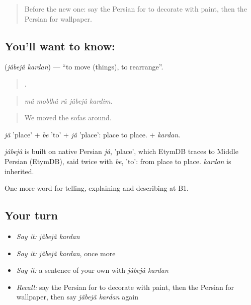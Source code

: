\label{lesson:FA-C537-jabeja-kardan}



\begin{quote}
Before the new one: say the Persian for to decorate with paint, then the Persian for wallpaper.
\end{quote}

\subsection*{You'll want to know:  }
\textbf{ } (\emph{jâbejâ kardan}) — \textquotedblleft{}to move (things), to rearrange\textquotedblright{}.

\begin{quote}
    .
\end{quote}

\begin{quote}
\emph{mâ moblhâ râ jâbejâ kardim.}
\end{quote}

\begin{quote}
We moved the sofas around.
\end{quote}

\emph{jâ} 'place' + \emph{be} 'to' + \emph{jâ} 'place': place to place. + \emph{kardan}.

\begin{cousinweb}
\emph{jâbejâ} is built on native Persian \emph{jâ}, 'place', which EtymDB traces to Middle Persian (EtymDB), said twice with \emph{be}, 'to': from place to place. \emph{kardan} is inherited.
\end{cousinweb}

\begin{grammarlens}[title={What you've built}]
One more word for telling, explaining and describing at B1.
\end{grammarlens}

\subsection*{Your turn}
\begin{itemize}
\raggedright
  \item \emph{Say it:} \emph{jâbejâ kardan}
  \item \emph{Say it:} \emph{jâbejâ kardan}, once more
  \item \emph{Say it:} a sentence of your own with \emph{jâbejâ kardan}
  \item \emph{Recall:} say the Persian for to decorate with paint, then the Persian for wallpaper, then say \emph{jâbejâ kardan} again
\end{itemize}


